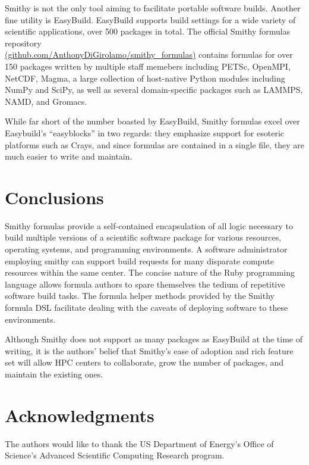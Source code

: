 \documentclass{acm_proc_article-sp}
\begin{document}
Smithy is not the only tool aiming to facilitate portable software builds.
Another fine utility is EasyBuild\cite{EasyBuild}. EasyBuild supports build
settings for a wide variety of scientific applications, over 500 packages in
total. The official Smithy formulas repository \\
\href{http://github.com/AnthonyDiGirolamo/smithy\_formulas}{(github.com/AnthonyDiGirolamo/smithy\_formulas)}
contains formulas for over 150 packages written by multiple staff memebers
including PETSc, OpenMPI, NetCDF, Magma, a large collection of host-native
Python modules including NumPy and SciPy, as well as several domain-specific
packages such as LAMMPS, NAMD, and Gromacs.

While far short of the number boasted by EasyBuild, Smithy formulas excel over
Easybuild's ``easyblocks'' in two regards: they emphasize support for esoteric
platforms such as Crays, and since formulas are contained in a single file, they
are much easier to write and maintain.

\section{Conclusions}

Smithy formulas provide a self-contained encapsulation of all logic necessary to
build multiple versions of a scientific software package for various resources,
operating systems, and programming environments. A software administrator
employing smithy can support build requests for many disparate compute resources
within the same center. The concise nature of the Ruby programming language
allows formula authors to spare themselves the tedium of repetitive software
build tasks. The formula helper methods provided by the Smithy formula DSL
facilitate dealing with the caveats of deploying software to these environments.

Although Smithy does not support as many packages as EasyBuild at the time of
writing, it is the authors' belief that Smithy's ease of adoption and rich
feature set will allow HPC centers to collaborate, grow the number of packages,
and maintain the existing ones.

\section{Acknowledgments}

The authors would like to thank the US Department of Energy's Office of
Science's Advanced Scientific Computing Research program.
\end{document}
